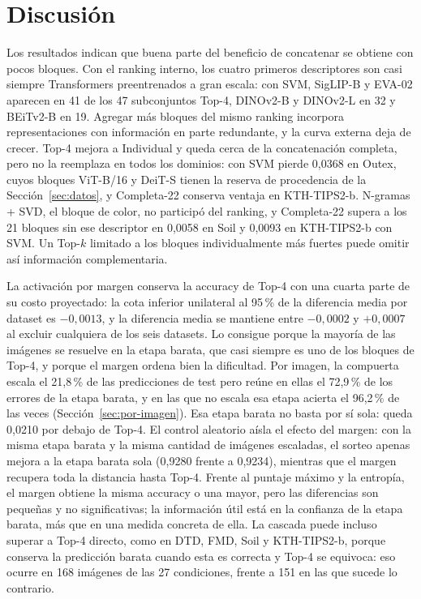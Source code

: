 \documentclass[a4paper,fleqn]{cas-sc}
\begin{document}
\section{Discusión}\label{sec:discusion}

Los resultados indican que buena parte del beneficio de concatenar se obtiene con pocos bloques. Con el ranking interno, los cuatro primeros descriptores son casi siempre Transformers preentrenados a gran escala: con SVM, SigLIP-B y EVA-02 aparecen en 41 de los 47 subconjuntos Top-4, DINOv2-B y DINOv2-L en 32 y BEiTv2-B en 19. Agregar más bloques del mismo ranking incorpora representaciones con información en parte redundante, y la curva externa deja de crecer. Top-4 mejora a Individual y queda cerca de la concatenación completa, pero no la reemplaza en todos los dominios: con SVM pierde 0,0368 en Outex, cuyos bloques ViT-B/16 y DeiT-S tienen la reserva de procedencia de la Sección~\ref{sec:datos}, y Completa-22 conserva ventaja en KTH-TIPS2-b. N-gramas + SVD, el bloque de color, no participó del ranking, y Completa-22 supera a los 21 bloques sin ese descriptor en 0,0058 en Soil y 0,0093 en KTH-TIPS2-b con SVM. Un Top-$k$ limitado a los bloques individualmente más fuertes puede omitir así información complementaria.

La activación por margen conserva la accuracy de Top-4 con una cuarta parte de su costo proyectado: la cota inferior unilateral al 95\,\% de la diferencia media por dataset es $-0{,}0013$, y la diferencia media se mantiene entre $-0{,}0002$ y $+0{,}0007$ al excluir cualquiera de los seis datasets. Lo consigue porque la mayoría de las imágenes se resuelve en la etapa barata, que casi siempre es uno de los bloques de Top-4, y porque el margen ordena bien la dificultad. Por imagen, la compuerta escala el 21,8\,\% de las predicciones de test pero reúne en ellas el 72,9\,\% de los errores de la etapa barata, y en las que no escala esa etapa acierta el 96,2\,\% de las veces (Sección~\ref{sec:por-imagen}). Esa etapa barata no basta por sí sola: queda 0,0210 por debajo de Top-4. El control aleatorio aísla el efecto del margen: con la misma etapa barata y la misma cantidad de imágenes escaladas, el sorteo apenas mejora a la etapa barata sola (0,9280 frente a 0,9234), mientras que el margen recupera toda la distancia hasta Top-4. Frente al puntaje máximo y la entropía, el margen obtiene la misma accuracy o una mayor, pero las diferencias son pequeñas y no significativas; la información útil está en la confianza de la etapa barata, más que en una medida concreta de ella. La cascada puede incluso superar a Top-4 directo, como en DTD, FMD, Soil y KTH-TIPS2-b, porque conserva la predicción barata cuando esta es correcta y Top-4 se equivoca: eso ocurre en 168 imágenes de las 27 condiciones, frente a 151 en las que sucede lo contrario.
\end{document}
